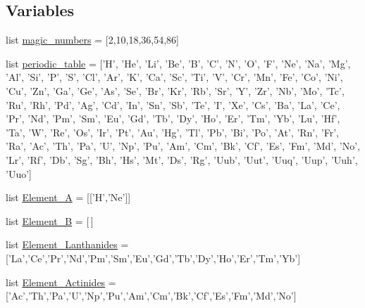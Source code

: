 \subsection*{Variables}
\begin{DoxyCompactItemize}
\item 
list \hyperlink{namespace_d_f_t___k_i_t_1_1core_1_1element_a6e392fcf7a27f5558bd9ebbebbe5df2b}{magic\+\_\+numbers} = \mbox{[}2,10,18,36,54,86\mbox{]}
\item 
list \hyperlink{namespace_d_f_t___k_i_t_1_1core_1_1element_ad08038b96f87f0dcae06dc0f14cfcedd}{periodic\+\_\+table} = \mbox{[}'H', 'He', 'Li', 'Be', 'B', 'C', 'N', 'O', 'F', 'Ne', 'Na', 'Mg', 'Al', 'Si', 'P', 'S', 'Cl', 'Ar', 'K', 'Ca', 'Sc', 'Ti', 'V', 'Cr', 'Mn', 'Fe', 'Co', 'Ni', 'Cu', 'Zn', 'Ga', 'Ge', 'As', 'Se', 'Br', 'Kr', 'Rb', 'Sr', 'Y', 'Zr', 'Nb', 'Mo', 'Tc', 'Ru', 'Rh', 'Pd', 'Ag', 'Cd', 'In', 'Sn', 'Sb', 'Te', 'I', 'Xe', 'Cs', 'Ba', 'La', 'Ce', 'Pr', 'Nd', 'Pm', 'Sm', 'Eu', 'Gd', 'Tb', 'Dy', 'Ho', 'Er', 'Tm', 'Yb', 'Lu', 'Hf', 'Ta', 'W', 'Re', 'Os', 'Ir', 'Pt', 'Au', 'Hg', 'Tl', 'Pb', 'Bi', 'Po', 'At', 'Rn', 'Fr', 'Ra', 'Ac', 'Th', 'Pa', 'U', 'Np', 'Pu', 'Am', 'Cm', 'Bk', 'Cf', 'Es', 'Fm', 'Md', 'No', 'Lr', 'Rf', 'Db', 'Sg', 'Bh', 'Hs', 'Mt', 'Ds', 'Rg', 'Uub', 'Uut', 'Uuq', 'Uup', 'Uuh', 'Uuo'\mbox{]}
\item 
list \hyperlink{namespace_d_f_t___k_i_t_1_1core_1_1element_a90aac6fdc68395eb984e465a21643f27}{Element\+\_\+\+A} = \mbox{[}\mbox{[}'H','Ne'\mbox{]}\mbox{]}
\item 
list \hyperlink{namespace_d_f_t___k_i_t_1_1core_1_1element_a6cb2038aec2c22410672ead088bf4a95}{Element\+\_\+\+B} = \mbox{[}$\,$\mbox{]}
\item 
list \hyperlink{namespace_d_f_t___k_i_t_1_1core_1_1element_a5185db281673b6298c79c39a681d92a9}{Element\+\_\+\+Lanthanides} = \mbox{[}'La','Ce','Pr','Nd','Pm','Sm','Eu','Gd','Tb','Dy','Ho','Er','Tm','Yb'\mbox{]}
\item 
list \hyperlink{namespace_d_f_t___k_i_t_1_1core_1_1element_ade7e546518077bee096b5ffb78f7181d}{Element\+\_\+\+Actinides} = \mbox{[}'Ac','Th','Pa','U','Np','Pu','Am','Cm','Bk','Cf','Es','Fm','Md','No'\mbox{]}
\end{DoxyCompactItemize}


